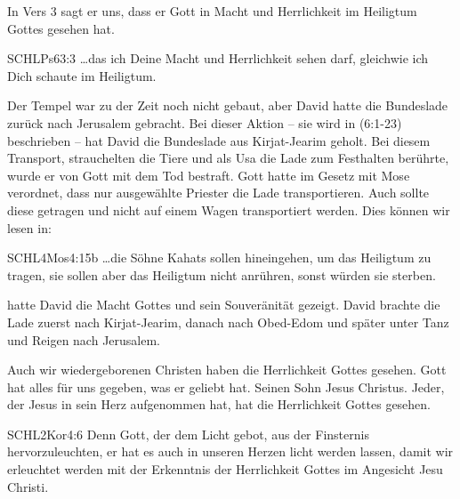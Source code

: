 \documentclass[14pt]{../../inc/mybib}
\begin{document}
    \begin{block}
        In Vers 3 sagt er uns, dass er Gott in Macht und Herrlichkeit im Heiligtum Gottes gesehen hat.
        \begin{bibelbox}{SCHL}{Ps}{63:3}
            \dots das ich Deine Macht und Herrlichkeit sehen darf, gleichwie ich Dich schaute im Heiligtum.
        \end{bibelbox}
        Der Tempel war zu der Zeit noch nicht gebaut, aber David hatte die Bundeslade zurück nach Jerusalem gebracht. Bei dieser Aktion -- sie wird in  (6:1-23) beschrieben -- hat David die Bundeslade aus Kirjat-Jearim geholt. Bei diesem Transport, strauchelten die Tiere und als Usa die Lade zum Festhalten berührte, wurde er von Gott mit dem Tod bestraft. Gott hatte im Gesetz mit Mose verordnet, dass nur ausgewählte Priester die Lade transportieren. Auch sollte diese getragen und nicht auf einem Wagen transportiert werden. Dies können wir lesen in:
        \begin{bibelbox}{SCHL}{4Mos}{4:15b}
            \dots die Söhne Kahats sollen hineingehen, um das Heiligtum zu tragen, sie sollen aber das Heiligtum nicht anrühren, sonst würden sie sterben.
        \end{bibelbox}
         hatte David die Macht Gottes und sein Souveränität gezeigt. David brachte die Lade zuerst nach Kirjat-Jearim, danach nach Obed-Edom und später unter Tanz und Reigen nach Jerusalem.
    \end{block}

    \begin{block}
        Auch wir wiedergeborenen Christen haben die Herrlichkeit Gottes gesehen. Gott hat alles für uns gegeben, was er geliebt hat. Seinen Sohn Jesus Christus. Jeder, der Jesus in sein Herz aufgenommen hat, hat die Herrlichkeit Gottes gesehen.
        \begin{bibelbox}{SCHL}{2Kor}{4:6}
            Denn Gott, der dem Licht gebot, aus der Finsternis hervorzuleuchten, er hat es auch in unseren Herzen licht werden lassen, damit wir erleuchtet werden mit der Erkenntnis der Herrlichkeit Gottes im Angesicht Jesu Christi.
        \end{bibelbox}
    \end{block}
\end{document}
